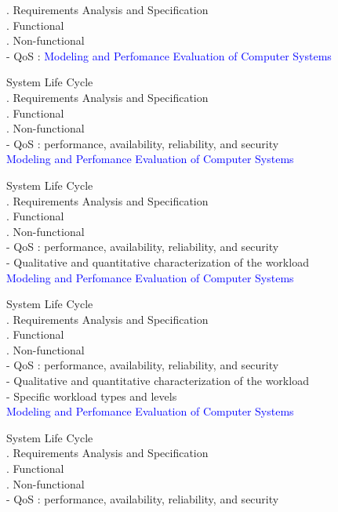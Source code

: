 \documentclass[svgnames]{beamer}
\begin{document}
. Requirements Analysis and Specification\\
. Functional\\
. Non-functional\\[20pt]
- QoS :
\newpage
\textcolor{blue}{Modeling and Perfomance Evaluation of Computer Systems} \\[38pt]
\raggedright
\! System Life Cycle\\
. Requirements Analysis and Specification\\
. Functional\\
. Non-functional\\[20pt]
- QoS : performance, availability, reliability, and security\\
\newpage
\textcolor{blue}{Modeling and Perfomance Evaluation of Computer Systems} \\[38pt]
\raggedright
\! System Life Cycle\\
. Requirements Analysis and Specification\\
. Functional\\
. Non-functional\\[20pt]
- QoS : performance, availability, reliability, and security\\
- Qualitative and quantitative characterization of the workload \\
\newpage
\textcolor{blue}{Modeling and Perfomance Evaluation of Computer Systems} \\[38pt]
\raggedright
\! System Life Cycle\\
. Requirements Analysis and Specification\\
. Functional\\
. Non-functional\\[20pt]
- QoS : performance, availability, reliability, and security\\
- Qualitative and quantitative characterization of the workload \\
- Specific workload types and levels \\
\newpage
\textcolor{blue}{Modeling and Perfomance Evaluation of Computer Systems} \\[38pt]
\raggedright
\! System Life Cycle\\
. Requirements Analysis and Specification\\
. Functional\\
. Non-functional\\[20pt]
- QoS : performance, availability, reliability, and security\\
\end{document}

